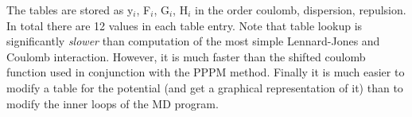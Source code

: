The tables are stored as y$_i$, F$_i$, G$_i$, H$_i$ in the order
coulomb, dispersion, repulsion.
In total there are 12 values in each table entry.
Note that table lookup is significantly {\em slower} than computation
of the most simple Lennard-Jones and Coulomb interaction. However, it
is much faster than the shifted coulomb function used in
conjunction with the PPPM method. Finally it is much easier to modify
a table for the potential (and get a graphical representation of it)
than to modify the inner loops of the MD program.
